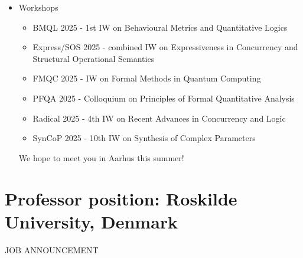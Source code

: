 \documentclass[prodmode,acmtecs]{acmsmall} %
\begin{document}
{\begin{itemize}
\begin{itemize}\item  Alessandro Abate, U of Oxford, UK. Title: Neural synthesis for verification and control of stochastic systems - certificates and abstractions
\item  Christel Baier, TU Dresden, Germany. Title: Linear Temporal Logic with Standpoint Modalities
\item  Lu Feng, University of Virginia, USA. Title: Runtime Safety for Learning-Enabled Cyber-Physical Systems: From Predictive Monitoring to Adaptive Shielding
\item  Arnd Hartmanns, U of Twente, NL. Title: Sound and Modest Approaches to Quantitative Model Checking from Sea to Space
\item  Chris Heunen, U of Edinburgh, UK. Title: Towards categorical quantum concurrency theory
\item  Christoph Matheja, U of Oldenburg, Germany and DTU Denmark. Title: Automating Proof Rules for Probabilistic Programs
\item  Ina Schieferdecker, Independent Researcher, Germany. Title: Empowering Testing with AI - Navigating the growing field of research on AI for software testing
\item  Jiri Srba, Aalborg University, Denmark. Title: On-the-Fly Verification: Advancements in Dependency Graphs
\end{itemize} 
\item  Workshops 
 
\begin{itemize}\item  BMQL 2025 - 1st IW on Behavioural Metrics and Quantitative Logics
\item  Express/SOS 2025 - combined IW on Expressiveness in Concurrency and Structural Operational Semantics
\item  FMQC 2025 - IW on Formal Methods in Quantum Computing
\item  PFQA 2025 - Colloquium on Principles of Formal Quantitative Analysis
\item  Radical 2025 -  4th IW on Recent Advances in Concurrency and Logic
\item  SynCoP 2025 - 10th IW on Synthesis of Complex Parameters
\end{itemize} 
  We hope to meet you in Aarhus this summer! 
 
\end{itemize}\section{Professor position: Roskilde University, Denmark}\label{Professorposition}JOB ANNOUNCEMENT 

}
\end{document}
